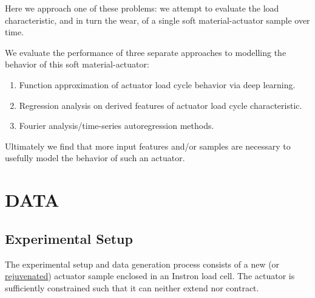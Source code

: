 \documentclass[letterpaper, 10 pt, conference]{ieeeconf}  %
\begin{document}
Here we approach one of these problems: we attempt to evaluate the load characteristic, and in turn the wear, of a single soft material-actuator sample over time.

We evaluate the performance of three separate approaches to modelling the behavior of this soft material-actuator:
\begin{enumerate}
	\item Function approximation of actuator load cycle behavior via deep learning.
  \item Regression analysis on derived features of actuator load cycle characteristic.
  \item Fourier analysis/time-series autoregression methods.
\end{enumerate}

Ultimately we find that more input features and/or samples are necessary to usefully model the behavior of such an actuator.


\section{DATA}

\subsection{Experimental Setup}
The experimental setup and data generation process consists of a new (or \href{https://www.cambridge.org/core/journals/mrs-communications/article/rejuvenation-of-soft-materialactuator/0D5EA2D555F28C616AB00B773DDFF313}{rejuvenated}) actuator sample enclosed in an Instron load cell. The actuator is sufficiently constrained such that it can neither extend nor contract.
\end{document}
